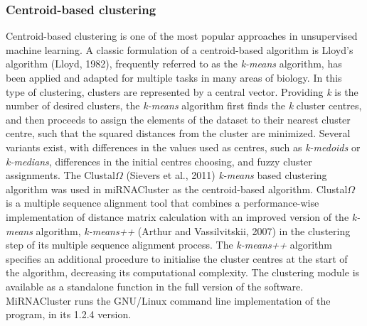 \documentclass[nocrop]{bioinfo}
\begin{document}
\begin{methods}
\subsubsection{Centroid-based clustering}
Centroid-based clustering is one of the most popular approaches in unsupervised machine learning. A classic formulation of a centroid-based algorithm is Lloyd's algorithm (Lloyd, 1982), frequently referred to as the \textit{k-means} algorithm, has been applied and adapted for multiple tasks in many areas of biology. In this type of clustering, clusters are represented by a central vector. Providing \textit{k} is the number of desired clusters, the \textit{k-means} algorithm first finds the \textit{k} cluster centres, and then proceeds to assign the elements of the dataset to their nearest cluster centre, such that the squared distances from the cluster are minimized. Several variants exist, with differences in the values used as centres, such as \textit{k-medoids} or \textit{k-medians}, differences in the initial centres choosing, and fuzzy cluster assignments. The Clustal$\Omega$ (Sievers et al., 2011) \textit{k-means} based clustering algorithm was used in miRNACluster as the centroid-based algorithm. Clustal$\Omega$ is a multiple sequence alignment tool that combines a performance-wise implementation of distance matrix calculation with an improved version of the \textit{k-means} algorithm, \textit{k-means++} (Arthur and Vassilvitskii, 2007) in the clustering step of its multiple sequence alignment process. The \textit{k-means++} algorithm specifies an additional procedure to initialise the cluster centres at the start of the algorithm, decreasing its computational complexity. The clustering module is available as a standalone function in the full version of the software. MiRNACluster runs the GNU/Linux command line implementation of the program, in its 1.2.4 version.


\end{methods}
\end{document}
